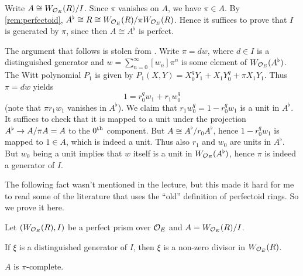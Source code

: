 \documentclass[a4paper, 10pt, oneside, DIV=9, chapterprefix=true, numbers=enddot,bibliography=totoc]{scrbook}
\begin{document}
\begin{proof*}
	Write $A\cong W_{\mathcal{O}_E}(R)/I$. Since $\pi$ vanishes on $A$, we have $\pi\in A$. By \cref{rem:perfectoid}, $A^\flat\cong R\cong W_{\mathcal{O}_E}(R)/\pi W_{\mathcal{O}_E}(R)$. Hence it suffices to prove that $I$ is generated by $\pi$, since then $A\cong A^\flat$ is perfect.
	
	The argument that follows is stolen from \cite[Lemma~3.10]{BMS}. Write $\pi=dw$, where $d\in I$ is a distinguished generator and $w=\sum_{n=0}^\infty [w_n]\pi^n$ is some element of $W_{\mathcal{O}_E}(A^\flat)$. The Witt polynomial $P_1$ is given by $P_1(X,Y)=X_0^qY_1+X_1Y_0^q+\pi X_1Y_1$. Thus $\pi=dw$ yields
	\begin{equation*}
		1=r_0^qw_1+r_1w_0^q
	\end{equation*}
	(note that $\pi r_1w_1$ vanishes in $A^\flat$). We claim that $r_1w_0^q=1-r_0^qw_1$ is a unit in $A^\flat$. It suffices to check that it is mapped to a unit under the projection $A^\flat\morphism A/\pi A=A$ to the $0^{\text{th}}$ component. But $A\cong A^\flat/r_0A^\flat$, hence $1-r_0^qw_1$ is mapped to $1\in A$, which is indeed a unit. Thus also $r_1$ and $w_0$ are units in $A^\flat$. But $w_0$ being a unit implies that $w$ itself is a unit in $W_{\mathcal{O}_E}(A^\flat)$, hence $\pi$ is indeed a generator of $I$.
\end{proof*}
The following fact wasn't mentioned in the lecture, but this made it hard for me to read some of the literature that uses the \enquote{old} definition of perfectoid rings. So we prove it here.
\begin{lem*}
	Let $(W_{\mathcal{O}_E}(R),I)$ be a perfect prism over $\mathcal{O}_E$ and $A=W_{\mathcal{O}_E}(R)/I$.
	\begin{alphanumerate}
		\item If $\xi$ is a distinguished generator of $I$, then $\xi$ is a non-zero divisor in $W_{\mathcal{O}_E}(R)$.
		\item $A$ is $\pi$-complete.
	\end{alphanumerate}
\end{lem*}
\end{document}
